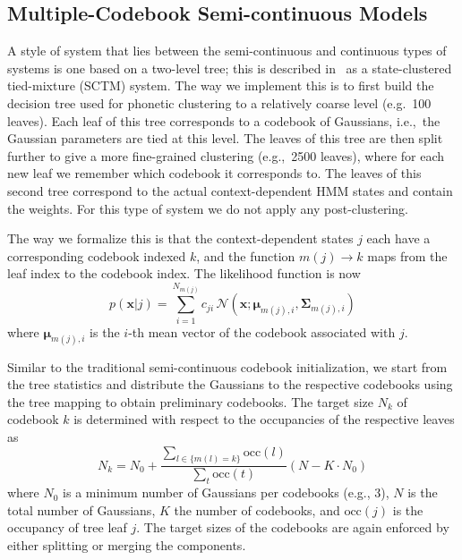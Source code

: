 \documentclass{article}
\def \x{{\mathbf x}}
\def \m{{\bm \mu}}
\def \k{{\mathbf \Sigma}}
\def \nv{{\mathcal N}}
\begin{document}
\subsection{Multiple-Codebook Semi-continuous Models}
A style of system that lies between the semi-continuous and continuous types of
systems is one based on a two-level tree; this is described in~\cite{prasad2004t2b}
as a state-clustered tied-mixture (SCTM) system. The way we implement this is
to first build the decision tree used for phonetic clustering to a relatively
coarse level (e.g.~100 leaves). Each leaf of this tree corresponds to a codebook 
of Gaussians, i.e.,~the Gaussian parameters are tied at this level. The leaves 
of this tree are then split further to give a more fine-grained clustering 
(e.g.,~2500 leaves), where for each new leaf we remember which codebook it corresponds to. The leaves of this second tree correspond to the actual context-dependent HMM states and contain the weights.
For this type of system we do not apply any post-clustering.

The way we formalize this is that the context-dependent states $j$ each have 
a corresponding codebook indexed $k$, and the function $m(j) \rightarrow k$ 
maps from the leaf index to the codebook index. The likelihood function is now
%
\begin{equation}
p(\x | j) = \sum_{i=1}^{N_{m(j)}} c_{ji} \, \nv\left(\x; \m_{m(j), i}, \k_{m(j), i}\right)
\end{equation}
%
where $\m_{m(j), i}$ is the $i$-th mean vector of the codebook
associated with $j$.

Similar to the traditional semi-continuous codebook initialization, we start
from the tree statistics and distribute the Gaussians to the respective codebooks
using the tree mapping to obtain preliminary codebooks.
The target size $N_k$ of codebook $k$ is determined with respect to 
the occupancies of the respective leaves as
\begin{equation}
N_k = N_0 + \frac
  { \sum_{l \in \{m(l) = k\}} \text{occ}(l) }
  { \sum_t \text{occ}(t) } 
  \left( N - K \cdot N_0 \right)
\end{equation}
where $N_0$ is a minimum number of Gaussians per codebooks (e.g., 3), $N$ is
the total number of Gaussians, $K$ the number of codebooks, and $\text{occ}(j)$ 
is the occupancy of tree leaf $j$. 
%
%
The target sizes of the codebooks are again enforced by either splitting or
merging the components.
\end{document}
